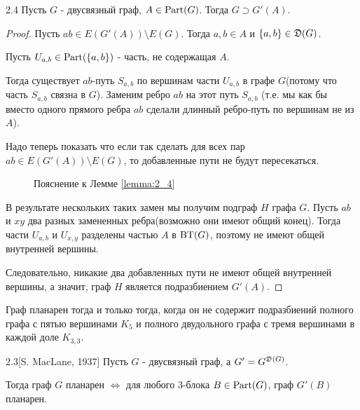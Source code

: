 \begin{customlm}{2.4} \label{lemma:2_4}
	Пусть $G$ - двусвязный граф,  $A \in \operatorname{Part}(G)$.
	Тогда  $G \supset G'(A)$.
\end{customlm}
\begin{proof}
	Пусть $ab \in E(G'(A)) \setminus E(G)$.
	Тогда  $a, b \in A$ и  $\{a, b\} \in \mathfrak{D}(G)$. 

	Пусть $U_{a, b} \in \operatorname{Part}(\{a, b\})$ - часть, не содержащая $A$.

	Тогда существует  $ab$-путь $S_{a, b}$ по вершинам части  $U_{a, b}$ в графе $G$(потому что часть $S_{a, b}$ связна в $G$).
	Заменим ребро  $ab$ на этот путь  $S_{a, b}$ (т.е. мы как бы вместо одного прямого ребра $ab$ сделали длинный ребро-путь по вершинам не из $A$).

	Надо теперь показать что если так сделать для всех пар $ab \in E(G'(A)) \setminus E(G)$, то добавленные пути не будут пересекаться.

\begin{figure}[ht]
    \centering
	\caption{Пояснение к Лемме \ref{lemma:2_4}}
    \label{fig:lemma_2_4}
\end{figure}

	В результате нескольких таких замен мы получим подграф $H$ графа  $G$.
	Пусть $ab$ и  $xy$ два разных замененных ребра(возможно они имеют общий конец).
	Тогда части  $U_{a, b}$ и  $U_{x, y}$ разделены частью  $A$ в  $\operatorname{BT}(G)$, поэтому не имеют общей внутренней вершины.

	Следовательно, никакие два добавленных пути не имеют общей внутренней вершины, а значит, граф $H$ является подразбиением  $G'(A)$.

\end{proof}


\begin{remrk} \label{remark:pontyagin_kuratowski}
	Граф планарен тогда и только тогда, когда он не содержит подразбиений полного графа с пятью вершинами $K_5$ и полного двудольного графа с тремя вершинами в каждой доле $K_{3,3}$.
\end{remrk}

\begin{customthm}{2.3}[S. MacLane, 1937] \label{theorem:2_3}
	Пусть $G$ - двусвязный граф, а  $G' = G^{\mathfrak{D}(G)}$.

	Тогда граф  $G$ планарен $\iff$ для любого 3-блока  $B \in \operatorname{Part}(G)$, граф  $G'(B)$ планарен.
\end{customthm}

